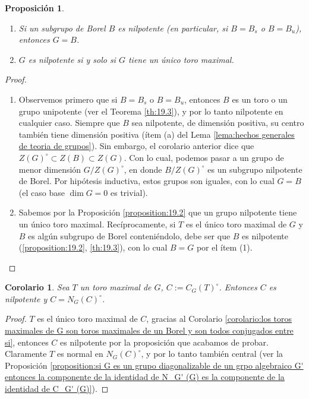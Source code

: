 \documentclass[spanish,12pt]{amsart}
\newtheorem{corollary}[theorem]{Corolario}
\newtheorem{proposition}[theorem]{Proposición}
\theoremstyle{definition}
\theoremstyle{remark}
\numberwithin{equation}{section}
\begin{document}
\begin{proposition}
\begin{enumerate}[(1)]
\item Si un subgrupo de Borel $B$ es nilpotente (en particular, si $B = B_s$ o $B = B_u$), entonces $G = B$.
\item $G$ es nilpotente si y solo si $G$ tiene un único toro maximal.
\end{enumerate}
\end{proposition}
\begin{proof}
\begin{enumerate}[(1)]
\item Observemos primero que si $B = B_s$ o $B = B_u$, entonces $B$ es un toro o un grupo unipotente (ver el Teorema \ref{th:19.3}), y por lo tanto nilpotente en cualquier caso. Siempre que $B$ sea nilpotente, de dimensión positiva, su centro también tiene dimensión positiva (ítem (a) del Lema \ref{lema:hechos generales de teoria de grupos}). Sin embargo, el corolario anterior dice que $Z(G)^\circ \subset Z (B) \subset Z (G)$. Con lo cual, podemos pasar a un grupo de menor dimensión $G/Z(G)^{\circ}$, en donde $B / Z(G)^\circ$ es un subgrupo nilpotente de Borel. Por hipótesis inductiva, estos grupos son iguales, con lo cual $G = B$ (el caso base $\dim G = 0$ es trivial).
\item Sabemos por la Proposición \ref{proposition:19.2} que un grupo nilpotente tiene un único toro maximal. Recíprocamente, si $T$ es el único toro maximal de $G$ y $B$ es algún subgrupo de Borel conteniéndolo, debe ser que $B$ es nilpotente (\ref{proposition:19.2}, \ref{th:19.3}), con lo cual $B = G$ por el ítem (1).
\end{enumerate}
\end{proof}

\begin{corollary}
Sea $T$ un toro maximal de $G$, $C := C_G (T)^\circ$. Entonces $C$ es nilpotente y $C = N_G (C)^\circ$.
\end{corollary}
\begin{proof}
$T$ es el único toro maximal de $C$, gracias al Corolario \ref{corolario:los toros maximales de G son toros maximales de un Borel y son todos conjugados entre si}, entonces $C$ es nilpotente por la proposición que acabamos de probar. Claramente $T$ es normal en $N_G (C)^\circ$, y por lo tanto también central (ver la Proposición \ref{proposition:si G es un grupo diagonalizable de un grpo algebraico G' entonces la componente de la identidad de N_G' (G) es la componente de la identidad de C_G' (G)}).
\end{proof}
\end{document}
